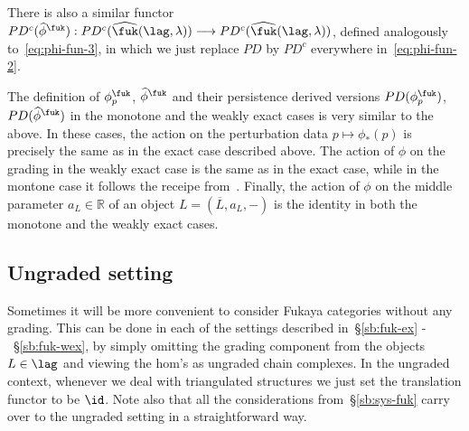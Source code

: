 There is also a similar functor
$PD^c(\widehat{\phi}^{\fuk}) : PD^c(\widehat{\fuk}(\lag, \lambda))
\longrightarrow PD^c(\widehat{\fuk}(\lag, \lambda))$, defined
analogously to~\eqref{eq:phi-fun-3}, in which we just replace $PD$ by
$PD^c$ everywhere in~\eqref{eq:phi-fun-2}.


The definition of $\phi^{\fuk}_{p}$, $\widehat{\phi}^{\fuk}$ and their
persistence derived versions $PD(\phi^{\fuk}_{p})$,
$PD(\widehat{\phi}^{\fuk})$ in the monotone and the weakly exact cases
is very similar to the above. In these cases, the action on the
perturbation data $p \mapsto \phi_*(p)$ is precisely the same as in
the exact case described above. The action of $\phi$ on the grading in
the weakly exact case is the same as in the exact case, while in the
montone case it follows the receipe
from~\cite[Section~2.b]{Se:graded}. Finally, the action of $\phi$ on
the middle parameter $a_L \in \mathbb{R}$ of an object
$L = (\overline{L}, a_L, -)$ is the identity in both the monotone and
the weakly exact cases.


\subsection{Ungraded setting} \label{sb:fuk-ungraded} Sometimes it
will be more convenient to consider Fukaya categories without any
grading. This can be done in each of the settings described
in~\S\ref{sb:fuk-ex} -~\S\ref{sb:fuk-wex}, by simply omitting the
grading component from the objects $L \in \lag$ and viewing the hom's
as ungraded chain complexes. In the ungraded context, whenever we deal
with triangulated structures we just set the translation functor to be
$\id$. Note also that all the considerations from~\S\ref{sb:sys-fuk}
carry over to the ungraded setting in a straightforward way.
